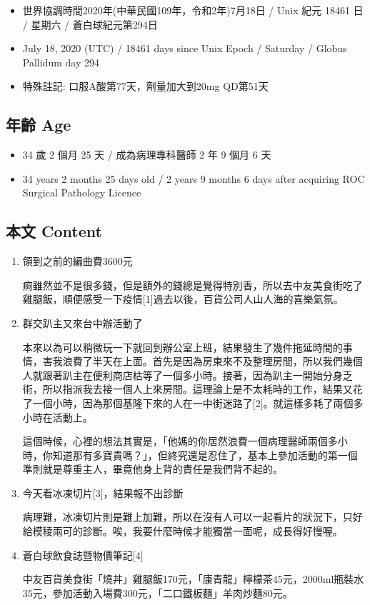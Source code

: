 \documentclass[
]{article}
\providecommand{\tightlist}{%
  \setlength{\itemsep}{0pt}\setlength{\parskip}{0pt}}
\begin{document}
\begin{itemize}
\tightlist
\item
  世界協調時間2020年(中華民國109年，令和2年)7月18日 / Unix 紀元 18461 日
  / 星期六 / 蒼白球紀元第294日
\item
  July 18, 2020 (UTC) / 18461 days since Unix Epoch / Saturday / Globus
  Pallidum day 294
\item
  特殊註記: 口服A酸第77天，劑量加大到20mg QD第51天
\end{itemize}

\hypertarget{ux5e74ux9f61-age-17}{%
\subsection{年齡 Age}\label{ux5e74ux9f61-age-17}}

\begin{itemize}
\tightlist
\item
  34 歲 2 個月 25 天 / 成為病理專科醫師 2 年 9 個月 6 天
\item
  34 years 2 months 25 days old / 2 years 9 months 6 days after
  acquiring ROC Surgical Pathology Licence
\end{itemize}

\hypertarget{ux672cux6587-content-17}{%
\subsection{本文 Content}\label{ux672cux6587-content-17}}

\begin{enumerate}
\def\labelenumi{\arabic{enumi}.}
\item
  領到之前的編曲費3600元

  痾雖然並不是很多錢，但是額外的錢總是覺得特別香，所以去中友美食街吃了雞腿飯，順便感受一下疫情{[}1{]}過去以後，百貨公司人山人海的喜樂氣氛。
\item
  群交趴主又來台中辦活動了

  本來以為可以稍微玩一下就回到辦公室上班，結果發生了幾件拖延時間的事情，害我浪費了半天在上面。首先是因為房東來不及整理房間，所以我們幾個人就跟著趴主在便利商店枯等了一個多小時。接著，因為趴主一開始分身乏術，所以指派我去接一個人上來房間。這理論上是不太耗時的工作，結果又花了一個小時，因為那個基隆下來的人在一中街迷路了{[}2{]}。就這樣多耗了兩個多小時在活動上。

  這個時候，心裡的想法其實是，「他媽的你居然浪費一個病理醫師兩個多小時，你知道那有多寶貴嗎？」，但終究還是忍住了，基本上參加活動的第一個準則就是尊重主人，畢竟他身上背的責任是我們背不起的。
\item
  今天看冰凍切片{[}3{]}，結果報不出診斷

  病理難，冰凍切片則是難上加難，所以在沒有人可以一起看片的狀況下，只好給模稜兩可的診斷。唉，我要什麼時候才能獨當一面呢，成長得好慢喔。
\item
  蒼白球飲食誌暨物價筆記{[}4{]}

  中友百貨美食街「燒丼」雞腿飯170元，「康青龍」檸檬茶45元，2000ml瓶裝水35元，參加活動入場費300元，「二口鐵板麵」羊肉炒麵80元。
\end{enumerate}
\end{document}
